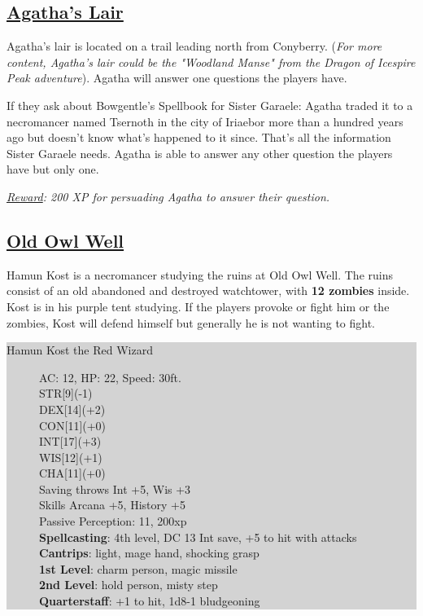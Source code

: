 \subsection{\underline{Agatha's Lair}}
Agatha's lair is located on a trail leading north from Conyberry. (\emph{For more content, Agatha's lair could be the "Woodland Manse" from the Dragon of Icespire Peak adventure}). Agatha will answer one questions the players have. 

If they ask about Bowgentle's Spellbook for Sister Garaele: Agatha traded it to a necromancer named Tsernoth in the city of Iriaebor more than a hundred years ago but doesn't know what's happened to it since. That's all the information Sister Garaele needs. Agatha is able to answer any other question the players have but only one.

\emph{\underline{Reward}: 200 XP for persuading Agatha to answer their question.} 

\subsection{\underline{Old Owl Well}}
Hamun Kost is a necromancer studying the ruins at Old Owl Well. The ruins consist of an old abandoned and destroyed watchtower, with \textbf{12 zombies} inside. Kost is in his purple tent studying. If the players provoke or fight him or the zombies, Kost will defend himself but generally he is not wanting to fight.

\colorbox{lightgray}{\begin{minipage}{0.4\textwidth}
		\begin{description}
			\item[Hamun Kost the Red Wizard]
			AC: 12, HP: 22, Speed: 30ft.
			\\ STR[9](-1) 
			\\ DEX[14](+2)
			\\ CON[11](+0)
			\\ INT[17](+3)
			\\ WIS[12](+1)
			\\ CHA[11](+0)
			\\ Saving throws Int +5, Wis +3
			\\ Skills Arcana +5, History +5
			\\ Passive Perception: 11, 200xp
			\\ \textbf{Spellcasting}: 4th level, DC 13 Int save, +5 to hit with attacks
			\\ \textbf{Cantrips}: light, mage hand, shocking grasp
			\\ \textbf{1st Level}: charm person, magic missile
			\\ \textbf{2nd Level}: hold person, misty step
			\\ \textbf{Quarterstaff}: +1 to hit, 1d8-1 bludgeoning 
		\end{description}
\end{minipage}}
\break

